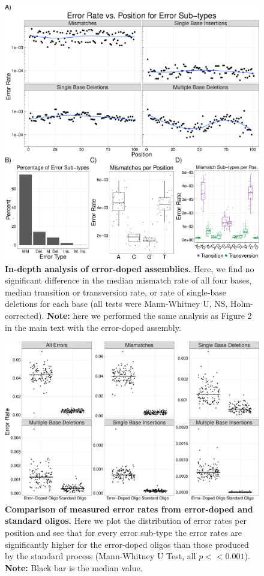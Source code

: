\documentclass[letterpaper,12pt]{article}
\begin{document}
\clearpage
\begin{figure}[t]
\centering
\includegraphics[width=174mm]{Figure_2-1.pdf}
\caption{\small \textbf{In-depth analysis of error-doped assemblies.} Here, we find no significant difference in the median mismatch rate of all four bases, median transition or transversion rate, or rate of single-base deletions for each base (all tests were Mann-Whitney U, NS, Holm-corrected). \textbf{Note:} here we performed the same analysis as Figure 2 in the main text with the error-doped assembly.}
\end{figure}

\clearpage
\begin{figure}[t]
\centering
\includegraphics[width=174mm]{Dope_vs_NonDope-1.pdf}
\caption{\small \textbf{Comparison of measured error rates from error-doped and standard oligos.} Here we plot the distribution of error rates per position and see that for every error sub-type the error rates are significantly higher for the error-doped oligos than those produced by the standard process (Mann-Whitney U Test, all $p << 0.001$). \textbf{Note:} Black bar is the median value.}
\end{figure}
\end{document}
